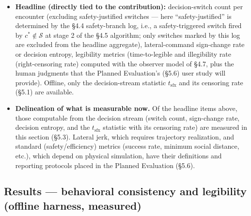 \documentclass[11pt]{article}
\begin{document}
\begin{itemize}
\item \textbf{Headline (directly tied to the contribution):} decision-switch count per encounter (excluding safety-justified switches --- here ``safety-justified'' is determined by the \S4.4 safety-branch log, i.e., a safety-triggered switch fired by $c^* \notin \mathcal{S}$ at stage 2 of the \S4.5 algorithm; only switches marked by this log are excluded from the headline aggregate), lateral-command sign-change rate or decision entropy, legibility metrics (time-to-legible and illegibility rate (right-censoring rate) computed with the observer model of \S4.7, plus the human judgments that the Planned Evaluation's (\S5.6) user study will provide). Offline, only the decision-stream statistic $t_{\text{sfx}}$ and its censoring rate (\S5.1) are available.
\item \textbf{Delineation of what is measurable now.} Of the headline items above, those computable from the decision stream (switch count, sign-change rate, decision entropy, and the $t_{\text{sfx}}$ statistic with its censoring rate) are measured in this section (\S5.3). Lateral jerk, which requires trajectory realization, and standard (safety/efficiency) metrics (success rate, minimum social distance, etc.), which depend on physical simulation, have their definitions and reporting protocols placed in the Planned Evaluation (\S5.6).
\end{itemize}

\FloatBarrier
\subsection{Results --- behavioral consistency and legibility (offline harness, measured)}
\end{document}
